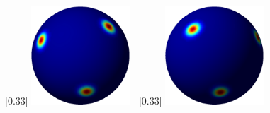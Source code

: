 \begin{frame}
{\begin{figure}
	[0.33\textwidth]{
		\includegraphics[width=0.33\textwidth,height=0.35\textheight,keepaspectratio]{figures/2017AAS_matrix_fisher/est_MF_mix_AAS17_1_11}}~
	[0.33\textwidth]{
		\includegraphics[width=0.33\textwidth,height=0.35\textheight,keepaspectratio]{figures/2017AAS_matrix_fisher/est_MF_mix_AAS17_1_501}}
\end{figure}
}

\end{frame}
